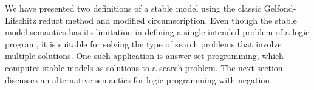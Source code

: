 We have presented two definitions of a stable model using the classic 
Gelfond-\\Lifschitz reduct method 
and modified circumscription. Even though the stable model semantics has its limitation in 
defining a single intended problem of a logic program, it is suitable for solving 
the type of search problems that involve multiple solutions. One such application is answer 
set programming, which computes stable models as solutions to a search problem. The next 
section discusses an alternative semantics for logic programming with negation.